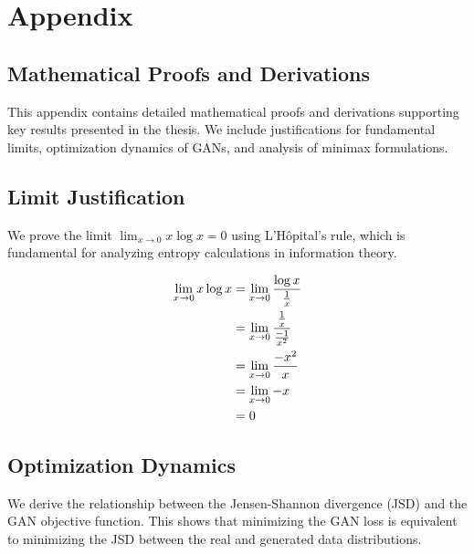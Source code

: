 \section{Appendix}
\subsection{Mathematical Proofs and Derivations}

This appendix contains detailed mathematical proofs and derivations supporting key results presented in the thesis. We include justifications for fundamental limits, optimization dynamics of GANs, and analysis of minimax formulations.

\subsection{Limit Justification}
\label{sec:limit-justification}
We prove the limit $\lim_{x \to 0} x\log{x} = 0$ using L'Hôpital's rule, which is fundamental for analyzing entropy calculations in information theory.

\begin{align}
  \label{justification:lhospital}
  \lim_{x \to 0} x\log{x} & = \lim_{x \to 0} {\log{x} \over {1 \over x}} \\
                          & = \lim_{x \to 0} {{1 \over x} \over {-1 \over x^2}}\\
                          & = \lim_{x \to 0} {-x^2 \over x} \\
                          & = \lim_{x \to 0} -x \\
                          & = 0
\end{align}

\subsection{Optimization Dynamics}
\label{sec:proof-for-jsd-thing}
We derive the relationship between the Jensen-Shannon divergence (JSD) and the GAN objective function. This shows that minimizing the GAN loss is equivalent to minimizing the JSD between the real and generated data distributions.

